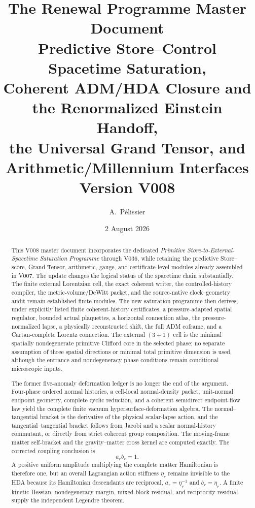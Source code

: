 \documentclass[11pt]{article}
\title{\textbf{The Renewal Programme Master Document}\\[0.35em]
\Large Predictive Store--Control Spacetime Saturation,\\[0.15em]
Coherent ADM/HDA Closure and the Renormalized Einstein Handoff,\\[0.15em]
the Universal Grand Tensor, and Arithmetic/Millennium Interfaces\\[0.3em]
\large Version V008}
\author{A.~P\'elissier}
\date{2 August 2026}
\theoremstyle{definition}
\theoremstyle{remark}
\begin{document}
\maketitle

\begin{abstract}
This V008 master document incorporates the dedicated
\emph{Primitive Store-to-External-Spacetime Saturation Programme} through
V036, while retaining the predictive Store--score, Grand Tensor,
arithmetic, gauge, and certificate-level modules already assembled in V007.
The update changes the logical status of the spacetime chain substantially.
The finite external Lorentzian cell, the exact coherent writer, the
controlled-history compiler, the metric-volume/DeWitt packet, and the
source-native clock--geometry audit remain established finite modules.  The
new saturation programme then derives, under explicitly listed finite
coherent-history certificates, a pressure-adapted spatial regulator, bounded
actual plaquettes, a horizontal connection atlas, the pressure-normalized
lapse, a physically reconstructed shift, the full ADM coframe, and a
Cartan-complete Lorentz connection.  The external \((3+1)\) cell is the
minimal spatially nondegenerate primitive Clifford core in the selected phase;
no separate assumption of three spatial directions or minimal total primitive
dimension is used, although the entrance and nondegeneracy phase conditions
remain conditional microscopic inputs.

The former five-anomaly deformation ledger is no longer the end of the
argument.  Four-phase ordered normal histories, a cell-local normal-density
packet, unit-normal endpoint geometry, complete cyclic reduction, and a
coherent semidirect endpoint-flow law yield the complete finite vacuum
hypersurface-deformation algebra.  The normal--tangential bracket is the
derivative of the physical scalar-lapse action, and the
tangential--tangential bracket follows from Jacobi and a scalar
normal-history commutant, or directly from strict coherent group composition.
The moving-frame matter self-bracket and the gravity--matter cross kernel are
computed exactly.  The corrected coupling conclusion is
\[
 a_rb_r=1.
\]
A positive uniform amplitude multiplying the complete matter Hamiltonian is
therefore one, but an overall Lagrangian action stiffness
\(\eta_r\) remains invisible to the HDA because its Hamiltonian descendants
are reciprocal, \(a_r=\eta_r^{-1}\) and \(b_r=\eta_r\).  A finite kinetic
Hessian, nondegeneracy margin, mixed-block residual, and reciprocity residual
supply the independent Legendre theorem.


\end{abstract}
\end{document}
